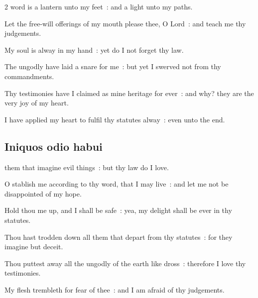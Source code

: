 \begin{multicols}{2}
 word is a lantern unto my feet~: and a light unto my paths.\par
{}
Let the free-will offerings of my mouth please thee, O Lord~: and teach me thy judgements.\par
{}My soul is alway in my hand~: yet do I not forget thy law.\par
{}The ungodly have laid a snare for me~: but yet I swerved not from thy commandments.\par
{}Thy testimonies have I claimed as mine heritage for ever~: and why? they are the very joy of my heart.\par
{}I have applied my heart to fulfil thy statutes alway~: even unto the end.\par

\vspace{-0.75\baselineskip}

\subsection{Iniquos odio habui}

\vspace{-0.25\baselineskip}

 them that imagine evil things~: but thy law do I love.\par
{}
O stablish me according to thy word, that I may live~: and let me not be disappointed of my hope.\par
{}Hold thou me up, and I shall be safe~: yea, my delight shall be ever in thy statutes.\par
{}Thou hast trodden down all them that depart from thy statutes~: for they imagine but deceit.\par
{}Thou puttest away all the ungodly of the earth like dross~: therefore I love thy testimonies.\par
{}My flesh trembleth for fear of thee~: and I am afraid of thy judgements.\par


\end{multicols}
